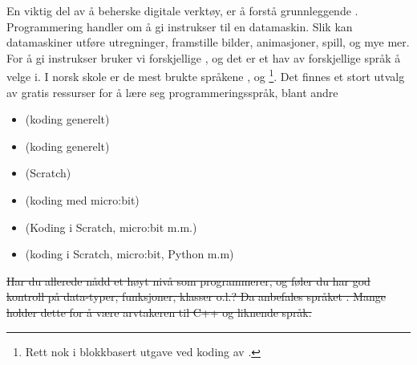 




En viktig del av å beherske digitale verktøy, er å forstå grunnleggende .	
Programmering handler om å gi instrukser til en datamaskin. Slik kan datamaskiner utføre utregninger, framstille bilder, animasjoner, spill, og mye mer. For å gi instrukser bruker vi forskjellige , og det er et hav av forskjellige språk å velge i. I norsk skole er de mest brukte språkene ,  og \footnote{Rett nok i blokkbasert utgave ved koding av .}. Det finnes et stort utvalg av gratis ressurser for å lære seg programmeringsspråk, blant andre
\begin{itemize}
	\item {} (koding generelt)
	\item {} (koding generelt)
	\item {} (Scratch)
	\item {} (koding med micro:bit)
	\item {} (Koding i Scratch, micro:bit m.m.)
	\item {} (koding i Scratch, micro:bit, Python m.m)
\end{itemize} \vsk

\st{Har du allerede nådd et høyt nivå som programmerer, og føler du har god kontroll på data-typer, funksjoner, klasser o.l.? Da anbefales språket . Mange holder dette for å være arvtakeren til C++ og liknende språk.}



